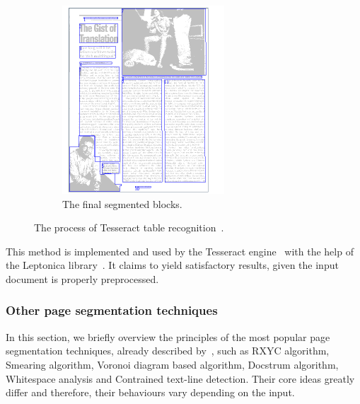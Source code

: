 \begin{figure}[p]
\begin{subfigure}{0.30\textwidth}
\includegraphics[width=\linewidth]{img/tabStopDetection/tessPageSegm5.pdf}
\caption{The final segmented blocks.}
\label{fig:segmentationTesseract5}
\end{subfigure}
\caption{The process of Tesseract table recognition~\cite{tesseractSegmentationTab}.}
\label{fig:segmentationTesseract}
\end{figure}

This method is implemented and used by the Tesseract engine~\cite{TesseractGIT} with the help of the Leptonica library~\cite{LeptonicaLIB}. It claims to yield satisfactory results, given the input document is properly preprocessed.

\subsubsection{Other page segmentation techniques}

In this section, we briefly overview the principles of the most popular page segmentation techniques, already described by~\citet{segmentationOverview}, such as RXYC algorithm, Smearing algorithm, Voronoi diagram based algorithm, Docstrum algorithm, Whitespace analysis and Contrained text-line detection. Their core ideas greatly differ and therefore, their behaviours vary depending on the input.

